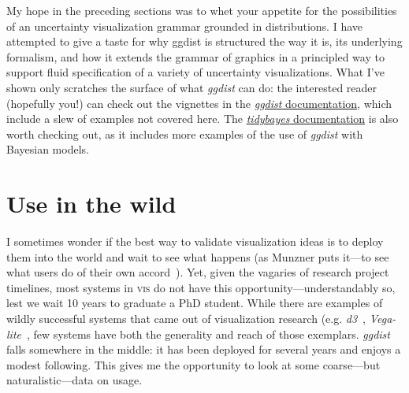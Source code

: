 \documentclass[journal]{vgtc}                     %
\begin{document}
My hope in the preceding sections was to whet your appetite for the possibilities of an uncertainty visualization grammar grounded in distributions. I have attempted to give a taste for why ggdist is structured the way it is, its underlying formalism, and how it extends the grammar of graphics in a principled way to support fluid specification of a variety of uncertainty visualizations. What I've shown only scratches the surface of what \textit{ggdist} can do: the interested reader (hopefully you!) can check out the vignettes in the \href{https://mjskay.github.io/ggdist/}{\textit{ggdist} documentation}, which include a slew of examples not covered here. The \href{https://mjskay.github.io/tidybayes/}{\textit{tidybayes} documentation} is also worth checking out, as it includes more examples of the use of \textit{ggdist} with Bayesian models.

\section{Use in the wild}
\label{sec:use-in-the-wild}


I sometimes wonder if the best way to validate visualization ideas is to deploy them into the world and wait to see what happens (as Munzner puts it---to see what users do of their own accord~\cite{munzner2009nested}). Yet, given the vagaries of research project timelines, most systems in \textsc{vis} do not have this opportunity---understandably so, lest we wait 10 years to graduate a PhD student. While there are examples of wildly successful systems that came out of visualization research (e.g. \textit{d3}~\cite{bostock2011d3}, \textit{Vega-lite}~\cite{satyanarayan2016vega}, few systems have both the generality and reach of those exemplars. \textit{ggdist} falls somewhere in the middle: it has been deployed for several years and enjoys a modest following. This gives me the opportunity to look at some coarse---but naturalistic---data on usage.
\end{document}
